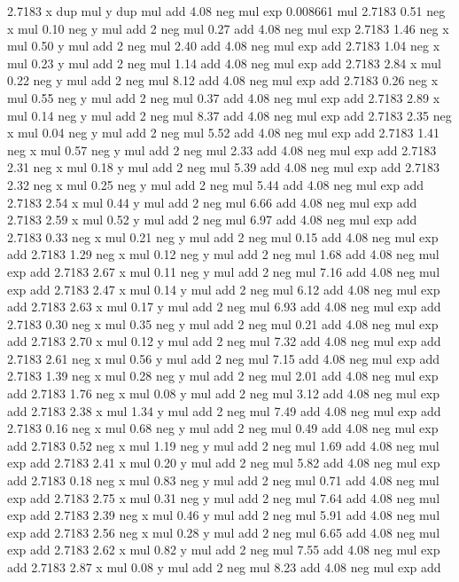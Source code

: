 2.7183 x dup mul y dup mul add 4.08 neg mul exp 0.008661 mul  %
2.7183 0.51 neg x mul 0.10 neg y mul add 2 neg mul 0.27 add 4.08 neg mul exp %
2.7183 1.46 neg x mul 0.50 y mul add 2 neg mul 2.40 add 4.08 neg mul exp add %
2.7183 1.04 neg x mul 0.23 y mul add 2 neg mul 1.14 add 4.08 neg mul exp add %
2.7183 2.84 x mul 0.22 neg y mul add 2 neg mul 8.12 add 4.08 neg mul exp add %
2.7183 0.26 neg x mul 0.55 neg y mul add 2 neg mul 0.37 add 4.08 neg mul exp add %
2.7183 2.89 x mul 0.14 neg y mul add 2 neg mul 8.37 add 4.08 neg mul exp add %
2.7183 2.35 neg x mul 0.04 neg y mul add 2 neg mul 5.52 add 4.08 neg mul exp add %
2.7183 1.41 neg x mul 0.57 neg y mul add 2 neg mul 2.33 add 4.08 neg mul exp add %
2.7183 2.31 neg x mul 0.18 y mul add 2 neg mul 5.39 add 4.08 neg mul exp add %
2.7183 2.32 neg x mul 0.25 neg y mul add 2 neg mul 5.44 add 4.08 neg mul exp add %
2.7183 2.54 x mul 0.44 y mul add 2 neg mul 6.66 add 4.08 neg mul exp add %
2.7183 2.59 x mul 0.52 y mul add 2 neg mul 6.97 add 4.08 neg mul exp add %
2.7183 0.33 neg x mul 0.21 neg y mul add 2 neg mul 0.15 add 4.08 neg mul exp add %
2.7183 1.29 neg x mul 0.12 neg y mul add 2 neg mul 1.68 add 4.08 neg mul exp add %
2.7183 2.67 x mul 0.11 neg y mul add 2 neg mul 7.16 add 4.08 neg mul exp add %
2.7183 2.47 x mul 0.14 y mul add 2 neg mul 6.12 add 4.08 neg mul exp add %
2.7183 2.63 x mul 0.17 y mul add 2 neg mul 6.93 add 4.08 neg mul exp add %
2.7183 0.30 neg x mul 0.35 neg y mul add 2 neg mul 0.21 add 4.08 neg mul exp add %
2.7183 2.70 x mul 0.12 y mul add 2 neg mul 7.32 add 4.08 neg mul exp add %
2.7183 2.61 neg x mul 0.56 y mul add 2 neg mul 7.15 add 4.08 neg mul exp add %
2.7183 1.39 neg x mul 0.28 neg y mul add 2 neg mul 2.01 add 4.08 neg mul exp add %
2.7183 1.76 neg x mul 0.08 y mul add 2 neg mul 3.12 add 4.08 neg mul exp add %
2.7183 2.38 x mul 1.34 y mul add 2 neg mul 7.49 add 4.08 neg mul exp add %
2.7183 0.16 neg x mul 0.68 neg y mul add 2 neg mul 0.49 add 4.08 neg mul exp add %
2.7183 0.52 neg x mul 1.19 neg y mul add 2 neg mul 1.69 add 4.08 neg mul exp add %
2.7183 2.41 x mul 0.20 y mul add 2 neg mul 5.82 add 4.08 neg mul exp add %
2.7183 0.18 neg x mul 0.83 neg y mul add 2 neg mul 0.71 add 4.08 neg mul exp add %
2.7183 2.75 x mul 0.31 neg y mul add 2 neg mul 7.64 add 4.08 neg mul exp add %
2.7183 2.39 neg x mul 0.46 y mul add 2 neg mul 5.91 add 4.08 neg mul exp add %
2.7183 2.56 neg x mul 0.28 y mul add 2 neg mul 6.65 add 4.08 neg mul exp add %
2.7183 2.62 x mul 0.82 y mul add 2 neg mul 7.55 add 4.08 neg mul exp add %
2.7183 2.87 x mul 0.08 y mul add 2 neg mul 8.23 add 4.08 neg mul exp add %
